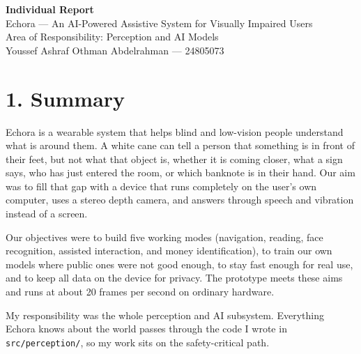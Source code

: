 \documentclass[12pt,a4paper]{report}
\begin{document}


\setcounter{page}{1}

\begin{center}
  {\large\bfseries Individual Report}\\[6pt]
  {\normalsize Echora --- An AI-Powered Assistive System for Visually Impaired Users}\\[4pt]
  {\normalsize Area of Responsibility: Perception and AI Models}\\[4pt]
  {\normalsize Youssef Ashraf Othman Abdelrahman --- 24805073}
\end{center}
\vspace{8pt}

\section*{1. Summary}

Echora is a wearable system that helps blind and low-vision people understand
what is around them. A white cane can tell a person that something is in front of
their feet, but not what that object is, whether it is coming closer, what a sign
says, who has just entered the room, or which banknote is in their hand. Our aim
was to fill that gap with a device that runs completely on the user's own
computer, uses a stereo depth camera, and answers through speech and vibration
instead of a screen.

Our objectives were to build five working modes (navigation, reading, face
recognition, assisted interaction, and money identification), to train our own
models where public ones were not good enough, to stay fast enough for real use,
and to keep all data on the device for privacy. The prototype meets these aims
and runs at about 20 frames per second on ordinary hardware.

My responsibility was the whole perception and AI subsystem. Everything Echora
knows about the world passes through the code I wrote in
\texttt{src/perception/}, so my work sits on the safety-critical path.

\end{document}
